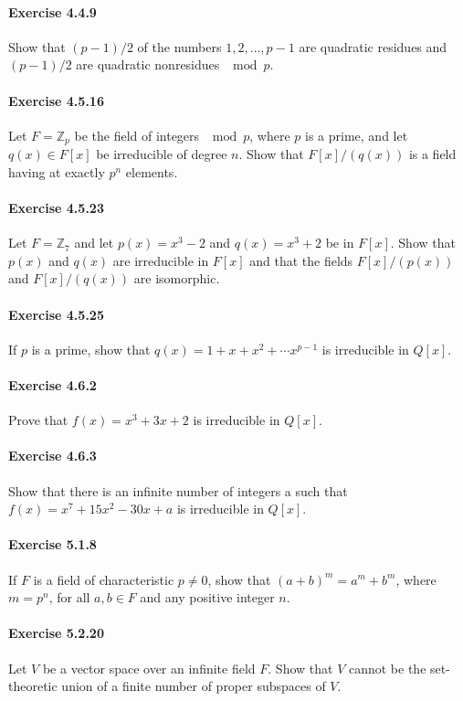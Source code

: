 \documentclass{article}
\begin{document}
\paragraph{Exercise 4.4.9} Show that $(p - 1)/2$ of the numbers $1, 2, \ldots, p - 1$ are quadratic residues and $(p - 1)/2$ are quadratic nonresidues $\mod p$.


\paragraph{Exercise 4.5.16} Let $F = \mathbb{Z}_p$ be the field of integers $\mod p$, where $p$ is a prime, and let $q(x) \in F[x]$ be irreducible of degree $n$. Show that $F[x]/(q(x))$ is a field having at exactly $p^n$ elements.


\paragraph{Exercise 4.5.23} Let $F = \mathbb{Z}_7$ and let $p(x) = x^3 - 2$ and $q(x) = x^3 + 2$ be in $F[x]$. Show that $p(x)$ and $q(x)$ are irreducible in $F[x]$ and that the fields $F[x]/(p(x))$ and $F[x]/(q(x))$ are isomorphic.


\paragraph{Exercise 4.5.25} If $p$ is a prime, show that $q(x) = 1 + x + x^2 + \cdots x^{p - 1}$ is irreducible in $Q[x]$.


\paragraph{Exercise 4.6.2} Prove that $f(x) = x^3 + 3x + 2$ is irreducible in $Q[x]$.


\paragraph{Exercise 4.6.3} Show that there is an infinite number of integers a such that $f(x) = x^7 + 15x^2 - 30x + a$ is irreducible in $Q[x]$.


\paragraph{Exercise 5.1.8} If $F$ is a field of characteristic $p \neq 0$, show that $(a + b)^m = a^m + b^m$, where $m = p^n$, for all $a, b \in F$ and any positive integer $n$.


\paragraph{Exercise 5.2.20} Let $V$ be a vector space over an infinite field $F$. Show that $V$ cannot be the set-theoretic union of a finite number of proper subspaces of $V$.
\end{document}
